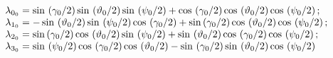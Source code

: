 \[\begin{array}{l} {\lambda_{0_{{\rm 0}} } =\sin \, \left({\gamma_{0}  \mathord{
\left/{\vphantom{\gamma_{0}  2}}\right.\kern-\nulldelimiterspace} 2} \right)\sin 
\, \left({\vartheta_{0}  \mathord{\left/{\vphantom{\vartheta_{0}  2}}\right.\kern-
\nulldelimiterspace} 2} \right)\sin \, \left({\psi_{0}  \mathord{\left/{\vphantom{
\psi_{0}  2}}\right.\kern-\nulldelimiterspace} 2} \right)+\cos \, \left({\gamma 
_{0}  \mathord{\left/{\vphantom{\gamma_{0}  2}}\right.\kern-\nulldelimiterspace} 
2} \right)\cos \, \left({\vartheta_{0}  \mathord{\left/{\vphantom{\vartheta_{0}  
2}}\right.\kern-\nulldelimiterspace} 2} \right)\cos \, \left({\psi_{0}  \mathord{
\left/{\vphantom{\psi_{0}  2}}\right.\kern-\nulldelimiterspace} 2} \right);} \\ 
{\lambda_{1_{{\rm 0}} } =-\sin \, \left({\vartheta_{0}  \mathord{\left/{\vphantom{
\vartheta_{0}  2}}\right.\kern-\nulldelimiterspace} 2} \right)\sin \, \left({\psi 
_{0}  \mathord{\left/{\vphantom{\psi_{0}  2}}\right.\kern-\nulldelimiterspace} 2} 
\right)\cos \, \left({\gamma_{0}  \mathord{\left/{\vphantom{\gamma_{0}  2}}\right.
\kern-\nulldelimiterspace} 2} \right)+\sin \left({\gamma_{0}  \mathord{\left/{\vphantom{
\gamma_{0}  2}}\right.\kern-\nulldelimiterspace} 2} \right)\cos \, \left({\vartheta 
_{0}  \mathord{\left/{\vphantom{\vartheta_{0}  2}}\right.\kern-\nulldelimiterspace} 
2} \right)\cos \, \left({\psi_{0}  \mathord{\left/{\vphantom{\psi_{0}  2}}\right.
\kern-\nulldelimiterspace} 2} \right);} \\ {\lambda_{2_{{\rm 0}} } =\sin \left({
\gamma_{0}  \mathord{\left/{\vphantom{\gamma_{0}  2}}\right.\kern-\nulldelimiterspace} 
2} \right)\cos \, \left({\vartheta_{0}  \mathord{\left/{\vphantom{\vartheta_{0}  
2}}\right.\kern-\nulldelimiterspace} 2} \right)\sin \, \left({\psi_{0}  \mathord{
\left/{\vphantom{\psi_{0}  2}}\right.\kern-\nulldelimiterspace} 2} \right)+\sin 
\, \left({\vartheta_{0}  \mathord{\left/{\vphantom{\vartheta_{0}  2}}\right.\kern-
\nulldelimiterspace} 2} \right)\cos \, \left({\gamma_{0}  \mathord{\left/{\vphantom{
\gamma_{0}  2}}\right.\kern-\nulldelimiterspace} 2} \right)\cos \, \left({\psi_{0}  
\mathord{\left/{\vphantom{\psi_{0}  2}}\right.\kern-\nulldelimiterspace} 2} \right);} 
\\ {\lambda_{3_{{\rm 0}} } =\sin \, \left({\psi_{0}  \mathord{\left/{\vphantom{
\psi_{0}  2}}\right.\kern-\nulldelimiterspace} 2} \right)\cos \, \left({\gamma_{0}  
\mathord{\left/{\vphantom{\gamma_{0}  2}}\right.\kern-\nulldelimiterspace} 2} \right)
\cos \, \left({\vartheta_{0}  \mathord{\left/{\vphantom{\vartheta_{0}  2}}\right.
\kern-\nulldelimiterspace} 2} \right)-\sin \, \left({\gamma_{0}  \mathord{\left/{
\vphantom{\gamma_{0}  2}}\right.\kern-\nulldelimiterspace} 2} \right)\sin \, \left({
\vartheta_{0}  \mathord{\left/{\vphantom{\vartheta_{0}  2}}\right.\kern-\nulldelimiterspace} 
2} \right)\cos \, \left({\psi_{0}  \mathord{\left/{\vphantom{\psi_{0}  2}}\right.
\kern-\nulldelimiterspace} 2} \right)} \end{array}\] 

